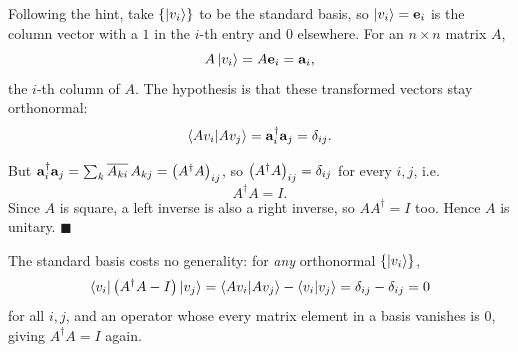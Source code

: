 \documentclass[a4paper, 10pt]{article}
\begin{document}
\begin{solution}
	\noindent Following the hint, take \( \{\ket{v_i}\} \) to be the standard basis, so \( \ket{v_i} = \mathbf{e}_i \) is the column vector with a \( 1 \) in the \( i \)-th entry and \( 0 \) elsewhere.
	For an \( n \times n \) matrix \( A \),
	\[
		A\ket{v_i} = A\mathbf{e}_i = \mathbf{a}_i,
	\]
	the \( i \)-th column of \( A \). The hypothesis is that these transformed vectors stay orthonormal:
	\[
		\braket{A v_i \vert A v_j} = \mathbf{a}_i^{\dagger}\mathbf{a}_j = \delta_{ij}.
	\]

	\noindent But \( \mathbf{a}_i^{\dagger}\mathbf{a}_j = \sum_{k} \overline{A_{ki}}\,A_{kj} = \left(A^{\dagger}A\right)_{ij} \),
	so \( \left(A^{\dagger}A\right)_{ij} = \delta_{ij} \) for every \( i, j \), i.e.
	\[
		A^{\dagger}A = I.
	\]
	Since \( A \) is square, a left inverse is also a right inverse, so \( AA^{\dagger} = I \) too. Hence \( A \) is unitary. \( \blacksquare \)

	\myspace

	\noindent The standard basis costs no generality: for \emph{any} orthonormal \( \{\ket{v_i}\} \),
	\[
		\bra{v_i}\left(A^{\dagger}A - I\right)\ket{v_j}
		= \braket{A v_i \vert A v_j} - \braket{v_i \vert v_j}
		= \delta_{ij} - \delta_{ij} = 0
	\]
	for all \( i, j \), and an operator whose every matrix element in a basis vanishes is \( 0 \), giving \( A^{\dagger}A = I \) again.
\end{solution}



\end{document}

